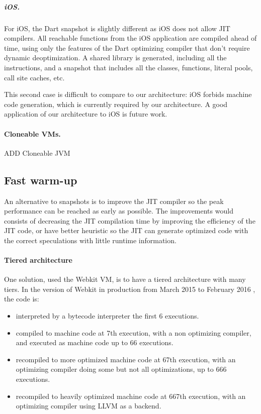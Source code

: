 \documentclass[a4paper,12pt,twoside]{../includes/ThesisStyle}
\begin{document}
\subparagraph{iOS.} For iOS, the Dart snapshot is slightly different as iOS does not allow JIT compilers. All reachable functions from the iOS application are compiled ahead of time, using only the features of the Dart optimizing compiler that don't require dynamic deoptimization. A shared library is generated, including all the instructions, and a snapshot that includes all the classes, functions, literal pools, call site caches, etc.

This second case is difficult to compare to our architecture: iOS forbids machine code generation, which is currently required by our architecture. A good application of our architecture to iOS is future work.

\paragraph{Cloneable VMs.}

ADD
Cloneable JVM
\cite{Kawa07a}

\subsection{Fast warm-up}

An alternative to snapshots is to improve the JIT compiler so the peak performance can be reached as early as possible. The improvements would consists of decreasing the JIT compilation time by improving the efficiency of the JIT code, or have better heuristic so the JIT can generate optimized code with the correct speculations with little runtime information.

\paragraph{Tiered architecture}
One solution, used the Webkit VM\cite{Webkit15}, is to have a tiered architecture with many tiers. In the version of Webkit in production from March 2015 to February 2016 \cite{Webkit15}, the code is:
\begin{itemize}
\item interpreted by a bytecode interpreter the first 6 executions.
\item compiled to machine code at 7th execution, with a non optimizing compiler, and executed as machine code up to 66 executions.
\item recompiled to more optimized machine code at 67th execution, with an optimizing compiler doing some but not all optimizations, up to 666 executions.
\item recompiled to heavily optimized machine code at 667th execution, with an optimizing compiler using LLVM as a backend.
\end{itemize}
\end{document}
